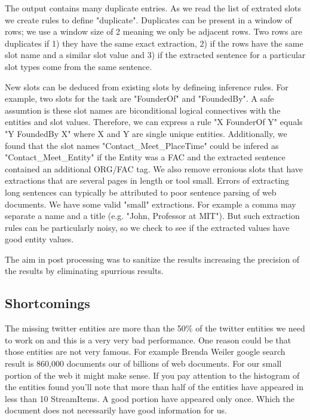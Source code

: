 The output contains many duplicate entries. As we read the list of extrated 
slots we create rules to define "duplicate". Duplicates can be present in a 
window of rows; we use a window size of 2 meaning we only be adjacent rows. 
Two rows are duplicates if 1) they have the same exact extraction, 2) if the 
rows have the same slot name and a similar slot value and 3) if the extracted 
sentence for a particular slot types come from the same sentence.

 New slots can be deduced from existing slots by defineing inference rules. 
 For example, two slots for the task are "FounderOf" and "FoundedBy". A safe 
 assumtion is these slot names are biconditional logical connectives with the 
 entities and slot values. Therefore, we can express a rule "X FounderOf Y" 
 equals "Y FoundedBy X" where X and Y are single unique entities. Additionally,
 we found that the slot names "Contact\_Meet\_PlaceTime" could be infered as
 "Contact\_Meet\_Entity" if the Entity was a FAC and the extracted sentence 
 contained an additional ORG/FAC tag.  
We also remove erronious slots that have extractions that are several pages in 
length or tool small. Errors of extracting long sentences can typically be 
attributed to poor sentence parsing of web documents. We have some valid
"small" extractions. For example a comma may separate a name and a title
(e.g. "John, Professor at MIT"). But such extraction rules can be particularly 
noisy, so we check to see if the extracted values have good entity values.

The aim in post processing was to sanitize the results increasing the 
precision of the results by eliminating spurrious results.

\subsection{Shortcomings}

The missing twitter entities are more than the 50\% of the twitter entities we 
need to work on and this is a very very bad performance. One reason could be 
that those entities are not very famous. For example Brenda Weiler google 
search result is 860,000 documents our of billions of web documents. For our 
small portion of the web it might make sense. If you pay attention to the 
histogram of the entities found you'll note that more than half of the 
entities have appeared in less than 10 StreamItems. A good portion have 
appeared only once. Which the document does not necessarily have good 
information for us.

